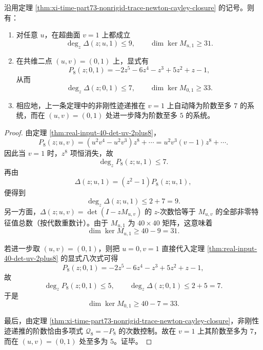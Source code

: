 \begin{theorem}[二维加权核在 \texorpdfstring{$v=1$}{v=1} 上发生共维一谱秩塌缩]\label{thm:xi-time-part73-v1-rank-collapse-codim2-tip}
沿用定理 \ref{thm:xi-time-part73-nonrigid-trace-newton-cayley-closure} 的记号。则有：
\begin{enumerate}
  \item 对任意 \(u\)，在超曲面 \(v=1\) 上都成立
  \[
  \deg_z \Delta(z;u,1)\le 9,
  \qquad
  \dim\ker M_{u,1}\ge 31.
  \]
  \item 在共维二点 \((u,v)=(0,1)\) 上，显式有
  \[
  P_8(z;0,1)=-2z^5-6z^4-z^3+5z^2+z-1,
  \]
  从而
  \[
  \deg_z \Delta(z;0,1)\le 7,
  \qquad
  \dim\ker M_{0,1}\ge 33.
  \]
  \item 相应地，上一条定理中的非刚性迹递推在 \(v=1\) 上自动降为阶数至多 \(7\) 的系统，而在 \((u,v)=(0,1)\) 处进一步降为阶数至多 \(5\) 的系统。
\end{enumerate}
\end{theorem}
\begin{proof}
由定理 \ref{thm:real-input-40-det-uv-2plus8}，
\[
P_8(z;u,v)
=(u^2v^4-u^2v^3)z^8+\cdots
=u^2v^3(v-1)z^8+\cdots.
\]
因此当 \(v=1\) 时，\(z^8\) 项恒消失，故
\[
\deg_z P_8(z;u,1)\le 7.
\]
再由
\[
\Delta(z;u,1)=(z^2-1)P_8(z;u,1),
\]
便得到
\[
\deg_z\Delta(z;u,1)\le 2+7=9.
\]
另一方面，\(\Delta(z;u,v)=\det(I-zM_{u,v})\) 的 \(z\)-次数恰等于 \(M_{u,v}\) 的全部非零特征值总数（按代数重数计）。由于 \(M_{u,1}\) 为 \(40\times 40\) 矩阵，这意味着
\[
\dim\ker M_{u,1}\ge 40-9=31.
\]

若进一步取 \((u,v)=(0,1)\)，则把 \(u=0,v=1\) 直接代入定理 \ref{thm:real-input-40-det-uv-2plus8} 的显式八次式可得
\[
P_8(z;0,1)=-2z^5-6z^4-z^3+5z^2+z-1,
\]
故
\[
\deg_z P_8(z;0,1)\le 5,
\qquad
\deg_z \Delta(z;0,1)\le 2+5=7.
\]
于是
\[
\dim\ker M_{0,1}\ge 40-7=33.
\]

最后，由定理 \ref{thm:xi-time-part73-nonrigid-trace-newton-cayley-closure}，非刚性迹递推的阶数恰由多项式 \(\mathcal Q_8=-P_8\) 的次数控制。故在 \(v=1\) 上其阶数至多为 \(7\)，而在 \((u,v)=(0,1)\) 处至多为 \(5\)。证毕。
\end{proof}

\endinput
